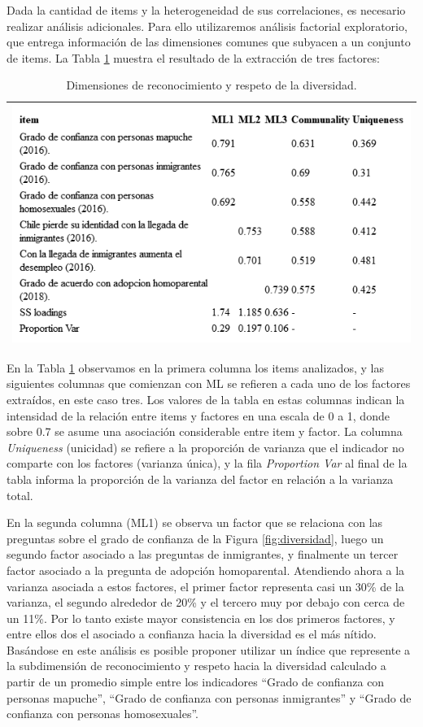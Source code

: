 \documentclass[
  12pt,
]{book}
\begin{document}
Dada la cantidad de items y la heterogeneidad de sus correlaciones, es necesario realizar análisis adicionales. Para ello utilizaremos análisis factorial exploratorio, que entrega información de las dimensiones comunes que subyacen a un conjunto de items. La Tabla \ref{tab:div-fa} muestra el resultado de la extracción de tres factores:

\begin{longtable}[]{@{}l@{}}
\caption{\label{tab:div-fa}Dimensiones de reconocimiento y respeto de la diversidad.}\tabularnewline
\toprule
\endhead
\includegraphics[width=8.33333in,height=\textheight]{output/tables/div_fa.png}\tabularnewline
\bottomrule
\end{longtable}

En la Tabla \ref{tab:div-fa} observamos en la primera columna los items analizados, y las siguientes columnas que comienzan con ML se refieren a cada uno de los factores extraídos, en este caso tres. Los valores de la tabla en estas columnas indican la intensidad de la relación entre items y factores en una escala de 0 a 1, donde sobre 0.7 se asume una asociación considerable entre item y factor. La columna \emph{Uniqueness} (unicidad) se refiere a la proporción de varianza que el indicador no comparte con los factores (varianza única), y la fila \emph{Proportion Var} al final de la tabla informa la proporción de la varianza del factor en relación a la varianza total.

En la segunda columna (ML1) se observa un factor que se relaciona con las preguntas sobre el grado de confianza de la Figura \ref{fig:diversidad}, luego un segundo factor asociado a las preguntas de inmigrantes, y finalmente un tercer factor asociado a la pregunta de adopción homoparental. Atendiendo ahora a la varianza asociada a estos factores, el primer factor representa casi un 30\% de la varianza, el segundo alrededor de 20\% y el tercero muy por debajo con cerca de un 11\%. Por lo tanto existe mayor consistencia en los dos primeros factores, y entre ellos dos el asociado a confianza hacia la diversidad es el más nítido. Basándose en este análisis es posible proponer utilizar un índice que represente a la subdimensión de reconocimiento y respeto hacia la diversidad calculado a partir de un promedio simple entre los indicadores ``Grado de confianza con personas mapuche'', ``Grado de confianza con personas inmigrantes'' y ``Grado de confianza con personas homosexuales''.
\end{document}
